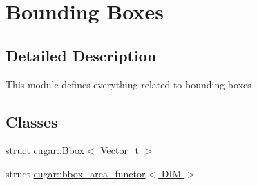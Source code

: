 \hypertarget{group___bbox_module}{}\section{Bounding Boxes}
\label{group___bbox_module}


\subsection{Detailed Description}
This module defines everything related to bounding boxes \subsection*{Classes}
\begin{DoxyCompactItemize}
\item 
struct \hyperlink{structcugar_1_1_bbox}{cugar\+::\+Bbox$<$ Vector\+\_\+t $>$}
\item 
struct \hyperlink{structcugar_1_1bbox__area__functor}{cugar\+::bbox\+\_\+area\+\_\+functor$<$ D\+I\+M $>$}
\end{DoxyCompactItemize}
